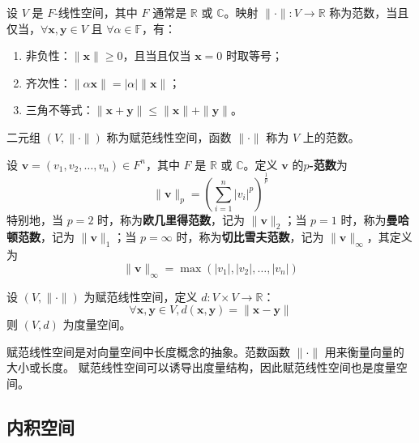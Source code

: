 \begin{definition}
    设 $ V $ 是 $F$-线性空间，其中 $F$ 通常是 $\mathbb{R}$ 或 $\mathbb{C}$。映射 $ \|\cdot\|:V\to \mathbb{R} $ 称为范数，当且仅当，$ \forall \mathbf{x},\mathbf{y}\in V $ 且 $ \forall \alpha\in \mathbb{F} $，有：
    \begin{enumerate}
        \item 非负性：$ \|\mathbf{x}\|\geq 0 $，且当且仅当 $ \mathbf{x}=0 $ 时取等号；
        \item 齐次性：$ \|\alpha \mathbf{x}\|=|\alpha|\|\mathbf{x}\| $；
        \item 三角不等式：$ \|\mathbf{x}+\mathbf{y}\| \leq \|\mathbf{x}\|+\|\mathbf{y}\| $。
    \end{enumerate}
    二元组 $ (V,\|\cdot\|) $ 称为赋范线性空间，函数 $ \|\cdot\| $ 称为 $ V $ 上的范数。
    \label{def:normed_linear_space}
\end{definition}

\begin{definition}[$p$-范数 $p$-Norm]
    设 $ \mathbf{v}=(v_1,v_2,\ldots,v_n)\in F^n $，其中 $F$ 是 $\mathbb{R}$ 或 $\mathbb{C}$。定义 $ \mathbf{v} $ 的\textbf{$p$-范数}为
    \[
        \|\mathbf{v}\|_p = \left( \sum_{i=1}^{n} |v_i|^p \right)^{\frac{1}{p}}
    \]
    特别地，当 $ p=2 $ 时，称为\textbf{欧几里得范数}，记为 $\|\mathbf{v}\|_2$；当 $ p=1 $ 时，称为\textbf{曼哈顿范数}，记为 $\|\mathbf{v}\|_1$；当 $ p=\infty $ 时，称为\textbf{切比雪夫范数}，记为 $\|\mathbf{v}\|_\infty$，其定义为
    \[
        \|\mathbf{v}\|_\infty = \max(|v_1|,|v_2|,\ldots,|v_n|)
    \]
    \label{def:p-norm}
\end{definition}

\begin{proposition}[赋范线性空间诱导的度量]
    设 $ (V,\|\cdot\|) $ 为赋范线性空间，定义 $ d:V\times V\to \mathbb{R} $：
    \[
        \forall \mathbf{x},\mathbf{y}\in V, d(\mathbf{x},\mathbf{y})=\|\mathbf{x}-\mathbf{y}\| 
    \]
    则 $ (V,d) $ 为度量空间。
\end{proposition}

\begin{note}
    赋范线性空间是对向量空间中长度概念的抽象。范数函数 $ \|\cdot\| $ 用来衡量向量的大小或长度。
    赋范线性空间可以诱导出度量结构，因此赋范线性空间也是度量空间。
\end{note}

\vspace{1em}

\subsection{内积空间}

